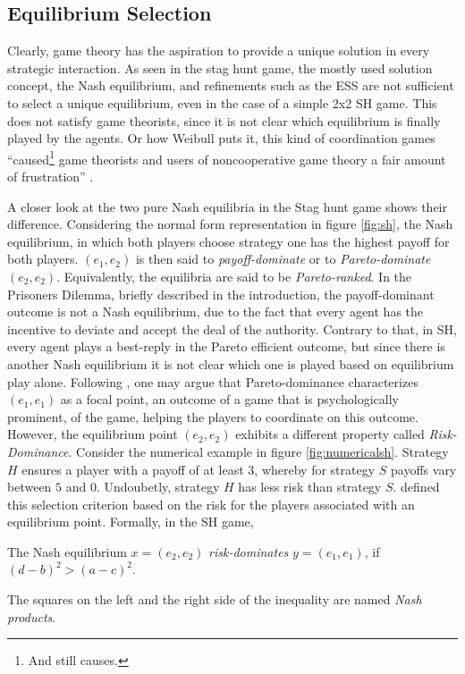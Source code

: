 \subsection{Equilibrium Selection}
\label{sec:equilibriumselection}
Clearly, game theory has the aspiration to provide a unique solution in every
strategic interaction.
As seen in the stag hunt game, the mostly used solution concept, 
the Nash equilibrium, and refinements such as the ESS are
not sufficient to select a unique equilibrium, even in the case of a simple
2x2 SH game. This does not satisfy game theorists, since it is not clear which
equilibrium is finally played by the agents. Or how 
Weibull puts it, this kind of coordination games 
``caused\footnote{And still causes.} game theorists and users of 
noncooperative game theory a fair amount of frustration'' 
\parencite[30]{weibull_evolutionary_1997}. 

A closer look at the two pure Nash equilibria in the Stag hunt game 
shows their difference. Considering the normal form representation in figure 
\ref{fig:sh}, the Nash equilibrium, in which both players choose strategy one 
has the highest payoff
for both players. $(e_1,e_2)$ is then said to 
\textit{payoff-dominate} or to \textit{Pareto-dominate} 
$(e_2,e_2)$. Equivalently, the equilibria are said to be
\textit{Pareto-ranked}.
In the Prisoners Dilemma, briefly described in the introduction, 
the payoff-dominant outcome is not a 
Nash equilibrium, due to the fact that every agent has the incentive to 
deviate and accept the deal of the authority.
Contrary to that, in SH, every agent plays a best-reply 
in the Pareto efficient outcome, but since there is another Nash equilibrium 
it is not clear which one is played based on equilibrium play alone. 
Following \textcite[57]{schelling_strategy_1960}, one may argue that 
Pareto-dominance characterizes $(e_1,e_1)$ as a focal point, 
an outcome of a game that is psychologically prominent, of 
the game, helping the players to coordinate on this outcome.
However, the equilibrium point $(e_2,e_2)$ exhibits a different property
called \textit{Risk-Dominance}. 
Consider the numerical example in figure \ref{fig:numericalsh}. 
Strategy $H$ ensures a player with a payoff of at least $3$, whereby for 
strategy $S$ payoffs vary between $5$ and $0$. Undoubetly, strategy $H$ has 
less risk than strategy $S$.  
\textcite{harsanyi_general_1988} defined this selection criterion 
based on the risk for the players associated with an 
equilibrium point. Formally, in the SH game, 
\begin{mydef}
The Nash equilibrium $x=(e_2,e_2)$ \textit{risk-dominates} 
$y=(e_1,e_1)$, if $(d-b)^2 > (a-c)^2$.
         \label{eq:riskdom}
 \end{mydef}
The squares on the left and the right side of the inequality are named
\textit{Nash products}.


